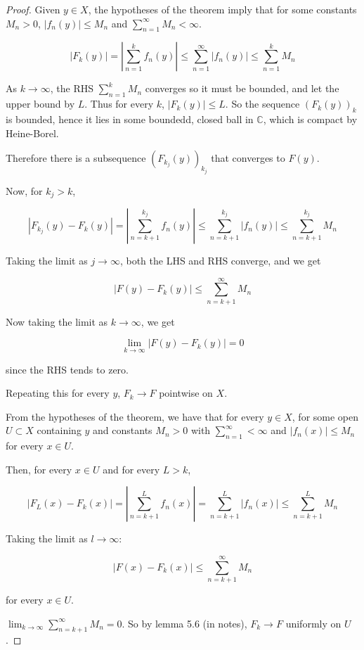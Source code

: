 \begin{proof}
	Given $y \in X$, the hypotheses of the theorem imply that for some constants $M_n > 0$, $|f_n(y)| \le M_n$ and $\sum_{n = 1}^{\infty} M_n < \infty$.

	\[|F_k(y)| = |\sum_{n = 1}^k f_n(y)| \le \sum_{n = 1}^{\infty} |f_n(y)| \le \sum_{n = 1}^k M_n\]

	As $k \rightarrow \infty$, the RHS $\sum_{n = 1}^k M_n$ converges so it must be bounded, and let the upper bound by $L$. Thus for every $k$, $|F_k(y)| \le L$. So the sequence ${(F_k(y))}_k$ is bounded, hence it lies in some boundedd, closed ball in $\mathbb{C}$, which is compact by Heine-Borel.

	Therefore there is a subsequence ${(F_{k_j}(y))}_{k_j}$ that converges to $F(y)$.

	Now, for $k_j > k$,

	\[|F_{k_j}(y) - F_k(y)| = |\sum_{n = k + 1}^{k_j} f_n(y)| \le \sum_{n = k + 1}^{k_j} |f_n(y)| \le \sum_{n = k + 1}^{k_j} M_n\]

	Taking the limit as $j \rightarrow \infty$, both the LHS and RHS converge, and we get

	\[|F(y) - F_k(y)| \le \sum_{n = k + 1}^{\infty} M_n\]

	Now taking the limit as $k \rightarrow \infty$, we get

	\[\lim_{k \rightarrow \infty} |F(y) - F_k(y)| = 0\]

	since the RHS tends to zero.

	Repeating this for every $y$, $F_k \rightarrow F$ pointwise on $X$.

	From the hypotheses of the theorem, we have that for every $y \in X$, for some open $U \subset X$ containing $y$ and constants $M_n > 0$ with $\sum_{n = 1}^{\infty} < \infty$ and $|f_n(x)| \le M_n$ for every $x \in U$.

	Then, for every $x \in U$ and for every $L > k$,

	\[|F_L(x) - F_k(x)| = |\sum_{n = k + 1}^L f_n(x)| = \sum_{n = k + 1}^L |f_n(x)| \le \sum_{n = k + 1}^L M_n\]

	Taking the limit as $l \rightarrow \infty$:

	\[|F(x) - F_k(x)| \le \sum_{n = k + 1}^{\infty} M_n\]

	for every $x \in U$.

	$\lim_{k \rightarrow \infty} \sum_{n = k + 1}^{\infty} M_n = 0$. So by lemma 5.6 (in notes), $F_k \rightarrow F$ uniformly on $U$.
\end{proof}

